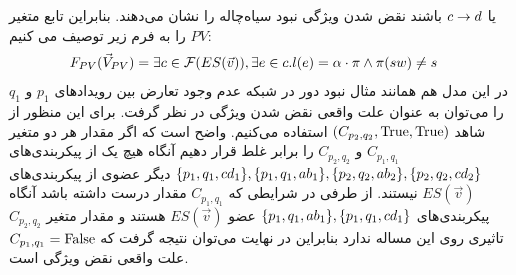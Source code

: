 یا 
$c \rightarrow d$
باشند نقض شدن ویژگی نبود سیاه‌چاله را نشان می‌دهند.
بنابراین تابع متغیر
$PV$
را به فرم زیر توصیف می کنیم:
\begin{align*}
    F_{PV}(\vec V_{PV}) & = \exists c \in \mathcal{F}(ES(\vec v)),
    \exists e \in c. l(e) =  \alpha\cdot\pi \wedge \pi(sw) \neq s
\end{align*}
در این مدل هم همانند مثال نبود دور در شبکه عدم وجود تعارض بین رویداد‌های 
$p_1$
و
$q_1$
را می‌توان به عنوان علت واقعی نقض شدن ویژگی در نظر گرفت.
برای این منظور از شاهد
$(C_{p_2,q_2},\mathrm{True},\mathrm{True})$
استفاده می‌کنیم.
واضح است که اگر مقدار هر دو متغیر
$C_{p_1,q_1}$
و
$C_{p_2,q_2}$
را برابر غلط قرار دهیم آنگاه هیچ یک از پیکر‌بندی‌های 
$\{p_1,q_1,cd_1\},\{p_1,q_1,ab_1\},\{p_2,q_2,ab_2\},\{p_2,q_2,cd_2\}$
دیگر عضوی از پیکربندی‌های 
$ES(\vec v)$
نیستند.
از طرفی در شرایطی که 
$C_{p_1,q_1}$
مقدار درست داشته باشد آنگاه پیکربندی‌های
$\{p_1,q_1,ab_1\},\{p_1,q_1,cd_1\}$
عضو
$ES(\vec v)$
هستند و مقدار متغیر
$C_{p_2,q_2}$
تاثیری روی این مساله ندارد بنابراین در نهایت می‌توان نتیجه گرفت که 
$C_{p_1,q_1} = \mathrm{False}$
علت واقعی نقض ویژگی است.